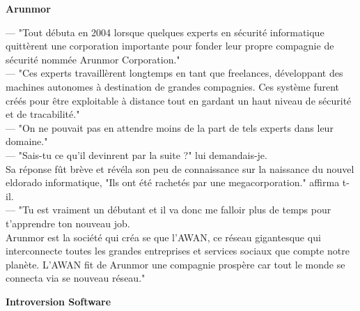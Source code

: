 \documentclass[11pt,twoside,a4paper]{book}
\begin{document}
\begin{multicols*}{2}
\begin{center}
	\textbf{\Large Arunmor}
\end{center} 
 
 --- "Tout d{\'e}buta en 2004 lorsque quelques experts en s{\'e}curit{\'e} informatique quitt{\`e}rent une corporation importante pour fonder leur propre compagnie de s{\'e}curit{\'e} nomm{\'e}e Arunmor Corporation."~\\
 --- "Ces experts travaill{\`e}rent longtemps en tant que freelances, d{\'e}veloppant des machines autonomes {\`a} destination de grandes compagnies. Ces syst{\`e}me furent cr{\'e}{\'e}s pour {\^e}tre exploitable {\`a} distance tout en gardant un haut niveau de s{\'e}curit{\'e} et de tracabilit{\'e}."~\\
 --- "On ne pouvait pas en attendre moins de la part de tels experts dans leur domaine."~\\
 --- "Sais-tu ce qu'il devinrent par la suite ?" lui demandais-je.~\\
Sa r{\'e}ponse f{\^u}t br{\`e}ve et r{\'e}v{\'e}la son peu de connaissance sur la naissance du nouvel eldorado informatique, "Ils ont {\'e}t{\'e} rachet{\'e}s par une megacorporation." affirma t-il.~\\
 --- "Tu est vraiment un d{\'e}butant et il va donc me falloir plus de temps pour t'apprendre ton nouveau job.~\\
Arunmor est la soci{\'e}t{\'e} qui cr{\'e}a se que l'AWAN, ce r{\'e}seau gigantesque qui interconnecte toutes les grandes entreprises et services sociaux que compte notre plan{\`e}te. L'AWAN fit de Arunmor une compagnie prosp{\`e}re car tout le monde se connecta via se nouveau r{\'e}seau."~\\ 

\begin{center}
	\textbf{\Large Introversion Software}
\end{center}


\end{multicols*}
\end{document}

